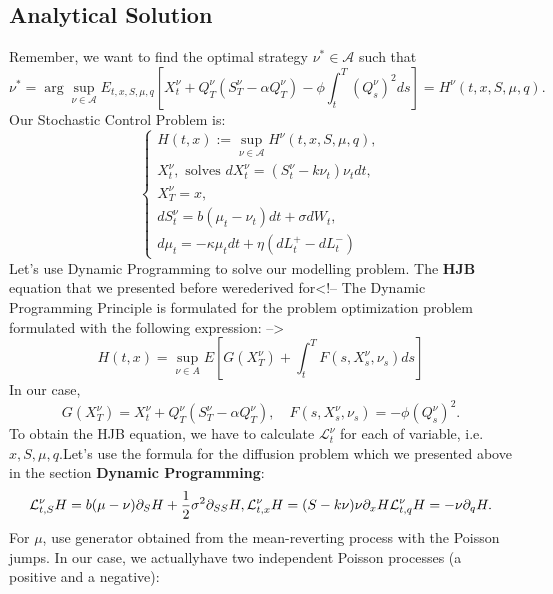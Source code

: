 \subsection{Analytical Solution}
Remember, we want to find the optimal strategy $\nu^* \in \mathcal A$ such that
\begin{displaymath}
	\nu^* = \arg\sup_{\nu \in \mathcal A} E_{t,x,S,\mu,q}\left[X^\nu_t + Q_T^\nu(S^\nu_T - \alpha Q^\nu_T) - \phi \int_t^T (Q^\nu_s)^2 ds\right] = H^\nu(t,x,S,\mu,q).
\end{displaymath}
Our Stochastic Control Problem is:
\begin{displaymath}
	\begin{cases}
	H(t,x):= \sup_{\nu \in \mathcal A}H^\nu(t,x,S,\mu,q), \\
	X^{\nu}_t,\text{ solves } d X_t^\nu = (S^\nu_t - k \nu_t) \nu_t dt, \\
	X^{\nu}_T = x,\\
	dS^\nu_t = b(\mu_t - \nu_t)dt + \sigma dW_t,\\
	d\mu_t = -\kappa \mu_t dt + \eta (dL_t^+ - dL_t^-)
	\end{cases}
\end{displaymath}
Let's use Dynamic Programming to solve our modelling problem. The \textbf{HJB} equation that we presented before werederived for<!-- The Dynamic Programming Principle is formulated for the problem optimization problem formulated with the following expression: -->
\begin{displaymath}
	H(t,x) = \sup_{\nu \in A} E \left[
	G(X^\nu_T) + \int^T_t F(s,X^\nu_s, \nu_s) ds
	\right]
\end{displaymath}
In our case,
\begin{displaymath}
	G(X^\nu_T) =
	X^\nu_t + Q_T^\nu(S^\nu_T - \alpha Q^\nu_T), \quad
	F(s,X^\nu_s, \nu_s) = -\phi (Q^\nu_s)^2.
\end{displaymath}
To obtain the HJB equation, we have to calculate $\mathcal L^\nu_t$ for each of variable, i.e. $x,S,\mu,q$.Let's use the formula for the diffusion problem which we presented above in the section \textbf{Dynamic Programming}:
\begin{displaymath}
	\mathcal L^\nu_{t,S}H = b(\mu-\nu) \partial_S H + \frac{1}{2} \sigma^2 \partial_{SS} H, \\
	\mathcal L^\nu_{t,x}H = (S-k\nu) \nu \partial_x H \\
	\mathcal L^\nu_{t,q}H = -\nu \partial_q H.
\end{displaymath}
For $\mu$, use generator obtained from the mean-reverting process with the Poisson jumps. In our case, we actuallyhave two independent Poisson processes (a positive and a negative):

